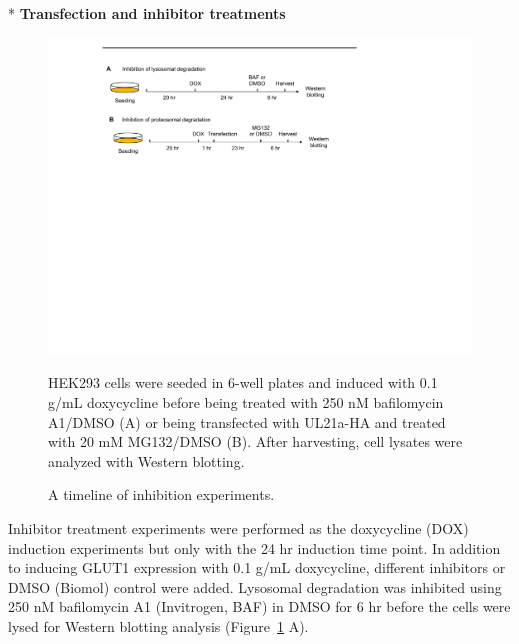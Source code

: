 \\*
\bfseries{Transfection and inhibitor treatments}\\
\begin{figure}[h]
\centering
\includegraphics[scale=0.7]{Figures/treatment}
\caption{A timeline of inhibition experiments.}
\vspace*{-3mm}
\small \justify
HEK293 cells were seeded in 6-well plates and induced with 0.1 \textmu g/mL doxycycline before being treated with 250 nM bafilomycin A1/DMSO (A) or being transfected with UL21a-HA and treated with 20 mM MG132/DMSO (B). After harvesting, cell lysates were analyzed with Western blotting.
\label{fig:inhibition}
\end{figure}
\normalfont Inhibitor treatment experiments were performed as the doxycycline (DOX) induction experiments but only with the 24 hr induction time point. In addition to inducing GLUT1 expression with 0.1 \textmu g/mL doxycycline, different inhibitors or DMSO (Biomol) control were added. Lysosomal degradation was inhibited using 250 nM bafilomycin A1 (Invitrogen, BAF) in DMSO for 6 hr before the cells were lysed for Western blotting analysis (Figure~\ref{fig:inhibition} A).

